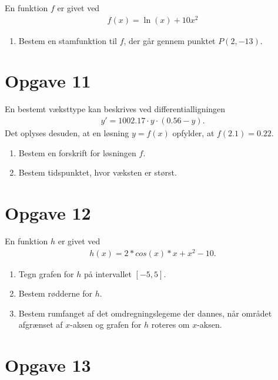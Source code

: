 \documentclass[12pt]{article}
\begin{document}
En funktion $f$ er givet ved
	\begin{align*}
		f(x) = \ln(x)+10x^2
	\end{align*}
	
\begin{enumerate}[label=\roman*)]
	\item Bestem en stamfunktion til $f$, der går gennem punktet $P(2,-13)$. 
\end{enumerate}

\section*{Opgave 11}

En bestemt væksttype kan beskrives ved differentialligningen
\begin{align*}
	y' = 1002.17\cdot y \cdot (0.56-y).
\end{align*}
Det oplyses desuden, at en løsning $y=f(x)$ opfylder, at $f(2.1) = 0.22$.

\begin{enumerate}[label=\roman*)]
	\item Bestem en forskrift for løsningen $f$.
	\item Bestem tidspunktet, hvor væksten er størst. 
\end{enumerate}

\section*{Opgave 12}

En funktion $h$ er givet ved
\begin{align*}
	h(x) = 2*cos(x)*x + x^2 - 10.
\end{align*}
\begin{enumerate}[label=\roman*)]
	\item Tegn grafen for $h$ på intervallet $[-5,5]$. 
	\item Bestem rødderne for $h$. 
	\item Bestem rumfanget af det omdregningslegeme der dannes, når området afgrænset af $x$-aksen og grafen for $h$ roteres om $x$-aksen.
\end{enumerate}

\section*{Opgave 13}
\end{document}

